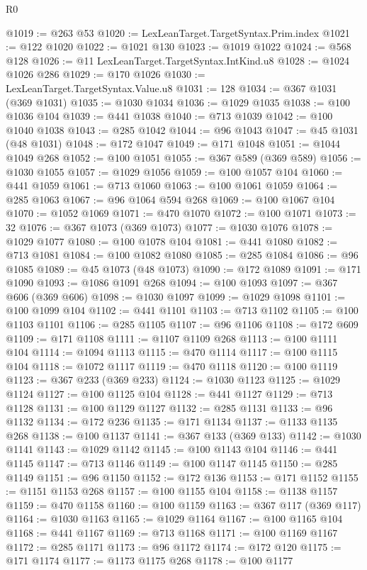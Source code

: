 \begin{lexlean}{R0}
\begin{coremodule}
@1019 := @263 @53
@1020 := LexLeanTarget.TargetSyntax.Prim.index
@1021 := @122 @1020
@1022 := @1021 @130
@1023 := @1019 @1022
@1024 := @568 @128
@1026 := @11 LexLeanTarget.TargetSyntax.IntKind.u8
@1028 := @1024 @1026 @286
@1029 := @170 @1026
@1030 := LexLeanTarget.TargetSyntax.Value.u8
@1031 := 128
@1034 := @367 @1031 (@369 @1031)
@1035 := @1030 @1034
@1036 := @1029 @1035
@1038 := @100 @1036 @104
@1039 := @441 @1038
@1040 := @713 @1039
@1042 := @100 @1040 @1038
@1043 := @285 @1042
@1044 := @96 @1043
@1047 := @45 @1031 (@48 @1031)
@1048 := @172 @1047
@1049 := @171 @1048
@1051 := @1044 @1049 @268
@1052 := @100 @1051
@1055 := @367 @589 (@369 @589)
@1056 := @1030 @1055
@1057 := @1029 @1056
@1059 := @100 @1057 @104
@1060 := @441 @1059
@1061 := @713 @1060
@1063 := @100 @1061 @1059
@1064 := @285 @1063
@1067 := @96 @1064 @594 @268
@1069 := @100 @1067 @104
@1070 := @1052 @1069
@1071 := @470 @1070
@1072 := @100 @1071
@1073 := 32
@1076 := @367 @1073 (@369 @1073)
@1077 := @1030 @1076
@1078 := @1029 @1077
@1080 := @100 @1078 @104
@1081 := @441 @1080
@1082 := @713 @1081
@1084 := @100 @1082 @1080
@1085 := @285 @1084
@1086 := @96 @1085
@1089 := @45 @1073 (@48 @1073)
@1090 := @172 @1089
@1091 := @171 @1090
@1093 := @1086 @1091 @268
@1094 := @100 @1093
@1097 := @367 @606 (@369 @606)
@1098 := @1030 @1097
@1099 := @1029 @1098
@1101 := @100 @1099 @104
@1102 := @441 @1101
@1103 := @713 @1102
@1105 := @100 @1103 @1101
@1106 := @285 @1105
@1107 := @96 @1106
@1108 := @172 @609
@1109 := @171 @1108
@1111 := @1107 @1109 @268
@1113 := @100 @1111 @104
@1114 := @1094 @1113
@1115 := @470 @1114
@1117 := @100 @1115 @104
@1118 := @1072 @1117
@1119 := @470 @1118
@1120 := @100 @1119
@1123 := @367 @233 (@369 @233)
@1124 := @1030 @1123
@1125 := @1029 @1124
@1127 := @100 @1125 @104
@1128 := @441 @1127
@1129 := @713 @1128
@1131 := @100 @1129 @1127
@1132 := @285 @1131
@1133 := @96 @1132
@1134 := @172 @236
@1135 := @171 @1134
@1137 := @1133 @1135 @268
@1138 := @100 @1137
@1141 := @367 @133 (@369 @133)
@1142 := @1030 @1141
@1143 := @1029 @1142
@1145 := @100 @1143 @104
@1146 := @441 @1145
@1147 := @713 @1146
@1149 := @100 @1147 @1145
@1150 := @285 @1149
@1151 := @96 @1150
@1152 := @172 @136
@1153 := @171 @1152
@1155 := @1151 @1153 @268
@1157 := @100 @1155 @104
@1158 := @1138 @1157
@1159 := @470 @1158
@1160 := @100 @1159
@1163 := @367 @117 (@369 @117)
@1164 := @1030 @1163
@1165 := @1029 @1164
@1167 := @100 @1165 @104
@1168 := @441 @1167
@1169 := @713 @1168
@1171 := @100 @1169 @1167
@1172 := @285 @1171
@1173 := @96 @1172
@1174 := @172 @120
@1175 := @171 @1174
@1177 := @1173 @1175 @268
@1178 := @100 @1177

\end{coremodule}
\end{lexlean}
